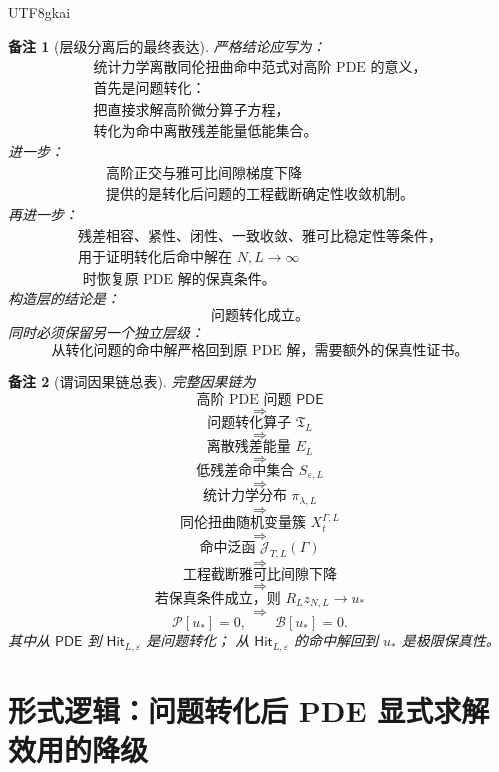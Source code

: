 \documentclass[12pt]{article}
\newtheorem{remark}{备注}[section]
\begin{document}
\begin{CJK*}{UTF8}{gkai}
\begin{remark}[层级分离后的最终表达]
严格结论应写为：
\[
  \boxed{
  \begin{gathered}
  \text{统计力学离散同伦扭曲命中范式对高阶 PDE 的意义，}\\
  \text{首先是问题转化：}\\
  \text{把直接求解高阶微分算子方程，}\\
  \text{转化为命中离散残差能量低能集合。}
  \end{gathered}
  }
\]
进一步：
\[
  \boxed{
  \begin{gathered}
  \text{高阶正交与雅可比间隙梯度下降}\\
  \text{提供的是转化后问题的工程截断确定性收敛机制。}
  \end{gathered}
  }
\]
再进一步：
\[
  \boxed{
  \begin{gathered}
  \text{残差相容、紧性、闭性、一致收敛、雅可比稳定性等条件，}\\
  \text{用于证明转化后命中解在 }N,L\to\infty\\
  \text{ 时恢复原 PDE 解的保真条件。}
  \end{gathered}
  }
\]
构造层的结论是：
\[
  \boxed{
  \text{问题转化成立。}
  }
\]
同时必须保留另一个独立层级：
\[
  \boxed{
  \text{从转化问题的命中解严格回到原 PDE 解，需要额外的保真性证书。}
  }
\]
\end{remark}

\begin{remark}[谓词因果链总表]
完整因果链为
\[
  \text{高阶 PDE 问题 }\mathsf{PDE}
\]
\[
  \Longrightarrow
\]
\[
  \text{问题转化算子 }\mathfrak T_L
\]
\[
  \Longrightarrow
\]
\[
  \text{离散残差能量 }E_L
\]
\[
  \Longrightarrow
\]
\[
  \text{低残差命中集合 }S_{\varepsilon,L}
\]
\[
  \Longrightarrow
\]
\[
  \text{统计力学分布 }\pi_{\lambda,L}
\]
\[
  \Longrightarrow
\]
\[
  \text{同伦扭曲随机变量簇 }X_t^{\Gamma,L}
\]
\[
  \Longrightarrow
\]
\[
  \text{命中泛函 }\mathcal J_{T,L}(\Gamma)
\]
\[
  \Longrightarrow
\]
\[
  \text{工程截断雅可比间隙下降}
\]
\[
  \Longrightarrow
\]
\[
  \text{若保真条件成立，则 }R_Lz_{N,L}\to u_*
\]
\[
  \Longrightarrow
\]
\[
  \mathcal P[u_*]=0,\qquad \mathcal B[u_*]=0.
\]
其中从 \(\mathsf{PDE}\) 到 \(\mathsf{Hit}_{L,\varepsilon}\) 是问题转化；
从 \(\mathsf{Hit}_{L,\varepsilon}\) 的命中解回到 \(u_*\) 是极限保真性。
\end{remark}

\clearpage

\section{形式逻辑：问题转化后 PDE 显式求解效用的降级}
\label{sec:tex55-pde-explicit-solution-demotion}


\end{CJK*}
\end{document}
